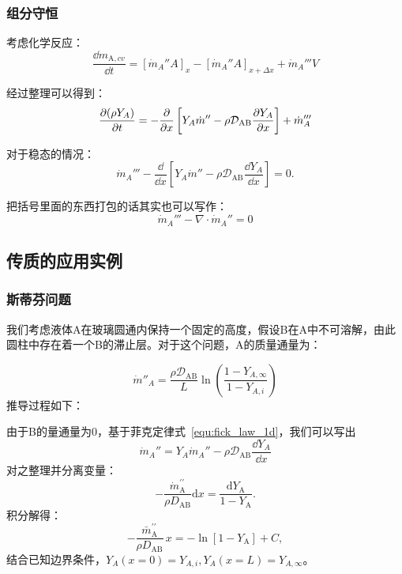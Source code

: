 \subsubsection{组分守恒}
考虑化学反应：
\begin{equation}
    \frac{\dd m_{\mathrm{A}, cv}}{\dd t} = [\dot{m}_A'' A]_x - [\dot{m}_A'' A]_{x+\Delta x} + \dot{m}_A''' V
\end{equation}

经过整理可以得到：
\begin{equation}
    \frac{\partial(\rho Y_A)}{\partial t} = -\frac{\partial}{\partial x}\left[Y_A\dot{m}'' - \rho \mathcal{D}_\mathrm{AB}\frac{\partial Y_A}{\partial x}\right] + \dot{m}_A'''
\end{equation}

对于稳态的情况：
\begin{equation}
    \dot{m}_A''' - \frac{\dd}{\dd x}\left[Y_A\dot{m}'' - \rho\mathcal{D}_\mathrm{AB}\frac{\dd Y_A}{\dd x}\right] = 0.
\end{equation}

把括号里面的东西打包的话其实也可以写作：
\begin{equation}
    \dot{m}_A''' - \nabla\cdot \dot{m}_A'' = 0
\end{equation}

\subsection{传质的应用实例}
\subsubsection{斯蒂芬问题}


我们考虑液体A在玻璃圆通内保持一个固定的高度，假设B在A中不可溶解，由此圆柱中存在着一个B的滞止层。对于这个问题，A的质量通量为：

{\tiny\begin{equation}
    \dot{m}''_A = \frac{\rho \mathcal{D}_\mathrm{AB}}{L}\ln\left(\frac{1-Y_{A,\infty}}{1-Y_{A,i}}\right)
\end{equation}
}
推导过程如下：
{\scriptsize\color{gray}

由于B的量通量为0，基于菲克定律式~\ref{equ:fick_law_1d}，我们可以写出
\[
    \dot{m}_A'' = Y_A\dot{m}_A'' - \rho \mathcal{D}_\mathrm{AB}\frac{\dd Y_A}{\dd x}
\]对之整理并分离变量：
\[
    -{\frac{\dot{m}_{\mathrm{A}}^{\prime\prime}}{\rho D_{\mathrm{AB}}}}\mathrm{d}x={\frac{\mathrm{d}Y_{\mathrm{A}}}{1-Y_{\mathrm{A}}}}.
\]
积分解得：
\[
    -{\frac{\bar{m}_{\mathrm{A}}^{\prime\prime}}{\rho D_{\mathrm{AB}}}}\,x=-\ln[1-Y_{\mathrm{A}}]+C,
\]结合已知边界条件，\(Y_A(x=0)=Y_{A,i}, Y_A(x=L)=Y_{A,\infty}\)。}


